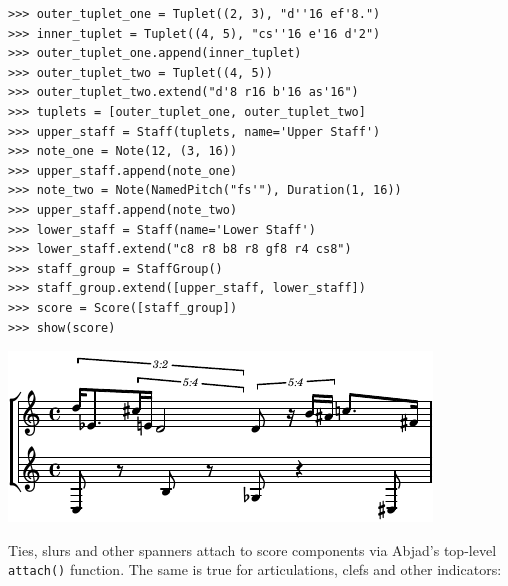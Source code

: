 \documentclass{article}
\begin{document}

\begin{lstlisting}
>>> outer_tuplet_one = Tuplet((2, 3), "d''16 ef'8.")
>>> inner_tuplet = Tuplet((4, 5), "cs''16 e'16 d'2")
>>> outer_tuplet_one.append(inner_tuplet)
>>> outer_tuplet_two = Tuplet((4, 5))
>>> outer_tuplet_two.extend("d'8 r16 b'16 as'16")
>>> tuplets = [outer_tuplet_one, outer_tuplet_two]
>>> upper_staff = Staff(tuplets, name='Upper Staff')
>>> note_one = Note(12, (3, 16))
>>> upper_staff.append(note_one)
>>> note_two = Note(NamedPitch("fs'"), Duration(1, 16))
>>> upper_staff.append(note_two)
>>> lower_staff = Staff(name='Lower Staff')
>>> lower_staff.extend("c8 r8 b8 r8 gf8 r4 cs8")
>>> staff_group = StaffGroup()
>>> staff_group.extend([upper_staff, lower_staff])
>>> score = Score([staff_group])
>>> show(score)
\end{lstlisting}
\includegraphics{assets/lilypond-3267998ba22aaacb9386665d12f8cce0.pdf}

\noindent Ties, slurs and other spanners attach to score components via Abjad's
top-level \texttt{attach()} function. The same is true for articulations, clefs
and other indicators:

\end{document}
